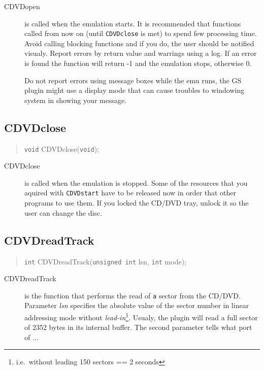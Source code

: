 \documentclass[10pt]{article}
\begin{document}
\begin{description}
\item[CDVDopen] is called when the emulation starts.
 It is recommended that functions called from now on (until
 \texttt{CDVDclose} is met) to spend few processing time. Avoid calling
 blocking functions and if you do, the user should be notified visualy.
 Report errors by return value and warrings using a log.
 If an error is found the function will return -1 and the emulation stops,
 otherwise 0.

Do not report errors using message boxes while the emu runs, the GS plugin
 might use a display mode that can cause troubles to windowing system
 in showing your message.
\end{description}



\subsection{CDVDclose}
\begin{quote}\texttt{void} CDVDclose(\texttt{void});\end{quote}

\begin{description}
\item[CDVDclose] is called when the emulation is stopped. Some of the
 resources that you aquired with \texttt{CDVDstart} have to be released now
 in order that other programs to use them. If you locked the CD/DVD tray,
 unlock it so the user can change the disc.
\end{description}



\subsection{CDVDreadTrack}
\begin{quote}\texttt{int} CDVDreadTrack(\texttt{unsigned int}
 lsn, \texttt{int} mode);\end{quote}

\begin{description}
\item[CDVDreadTrack] is the function that performs the read of \texttt{a}
 sector from the CD/DVD. Parameter \emph{lsn} specifies the absolute value
 of the sector number in linear addressing mode without \emph{lead-in}\footnote{i.e.\
without leading 150 sectors == 2 seconds}. Usualy, the plugin will read
 a full sector of 2352 bytes in its internal buffer.
 The second parameter tells what port of ...
\end{description}
\end{document}
